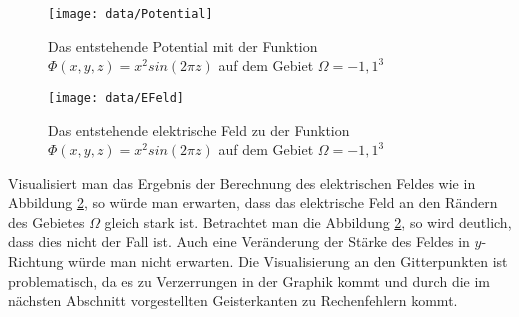\begin{figure}[h] 
	\texttt{[image: data/Potential]} 
	\caption{Das entstehende Potential mit der Funktion $\Phi(x,y,z)=x^2sin(2\pi z)$ auf dem Gebiet $\Omega = {-1,1}^3$} 
	\label{fig:Pot} 
\end{figure} 
\begin{figure}[h] 
	\texttt{[image: data/EFeld]} 
	\caption{Das entstehende elektrische Feld zu der Funktion $\Phi(x,y,z)=x^2sin(2\pi z)$ auf dem Gebiet $\Omega = {-1,1}^3$} 
	\label{fig:EFeld} 
\end{figure} 
Visualisiert man das Ergebnis der Berechnung des elektrischen Feldes wie in Abbildung \ref{fig:EFeld}, so würde man erwarten, dass das elektrische Feld an den Rändern des Gebietes $\Omega$ gleich stark ist. Betrachtet man die Abbildung \ref{fig:EFeld}, so wird deutlich, dass dies nicht der Fall ist. Auch eine Veränderung der Stärke des Feldes in $y$-Richtung würde man nicht erwarten. Die Visualisierung an den Gitterpunkten ist problematisch, da es zu Verzerrungen in der Graphik kommt und durch die im nächsten Abschnitt vorgestellten Geisterkanten zu Rechenfehlern kommt.
 
